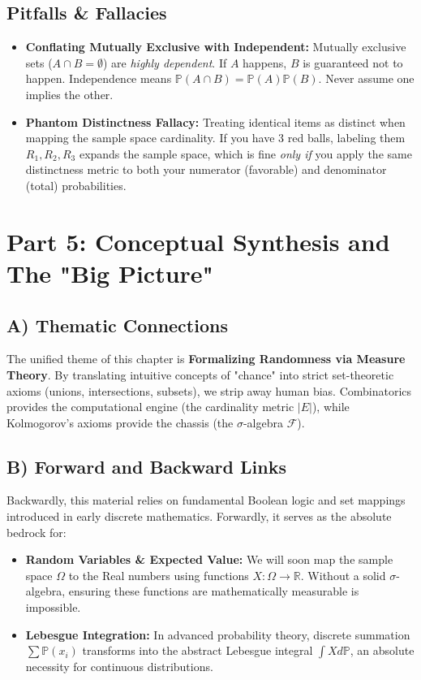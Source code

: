 \documentclass[11pt, letterpaper]{article}
\theoremstyle{definition}
\theoremstyle{remark}
\newcommand{\Prob}{\mathbb{P}}
\begin{document}
\subsection{Pitfalls \& Fallacies}
\begin{itemize}
    \item \textbf{Conflating Mutually Exclusive with Independent:} Mutually exclusive sets ($A \cap B = \emptyset$) are \textit{highly dependent}. If $A$ happens, $B$ is guaranteed not to happen. Independence means $\Prob(A \cap B) = \Prob(A)\Prob(B)$. Never assume one implies the other.
    \item \textbf{Phantom Distinctness Fallacy:} Treating identical items as distinct when mapping the sample space cardinality. If you have 3 red balls, labeling them $R_1, R_2, R_3$ expands the sample space, which is fine \textit{only if} you apply the same distinctness metric to both your numerator (favorable) and denominator (total) probabilities.
\end{itemize}

\newpage
\section{Part 5: Conceptual Synthesis and The "Big Picture"}

\subsection{A) Thematic Connections}
The unified theme of this chapter is \textbf{Formalizing Randomness via Measure Theory}. By translating intuitive concepts of "chance" into strict set-theoretic axioms (unions, intersections, subsets), we strip away human bias. Combinatorics provides the computational engine (the cardinality metric $|E|$), while Kolmogorov’s axioms provide the chassis (the $\sigma$-algebra $\mathscr{F}$). 

\subsection{B) Forward and Backward Links}
Backwardly, this material relies on fundamental Boolean logic and set mappings introduced in early discrete mathematics. Forwardly, it serves as the absolute bedrock for:
\begin{itemize}
    \item \textbf{Random Variables \& Expected Value:} We will soon map the sample space $\Omega$ to the Real numbers using functions $X: \Omega \to \mathbb{R}$. Without a solid $\sigma$-algebra, ensuring these functions are mathematically measurable is impossible.
    \item \textbf{Lebesgue Integration:} In advanced probability theory, discrete summation $\sum \Prob(x_{i})$ transforms into the abstract Lebesgue integral $\int X d\mathbb{P}$, an absolute necessity for continuous distributions.
\end{itemize}
\end{document}
